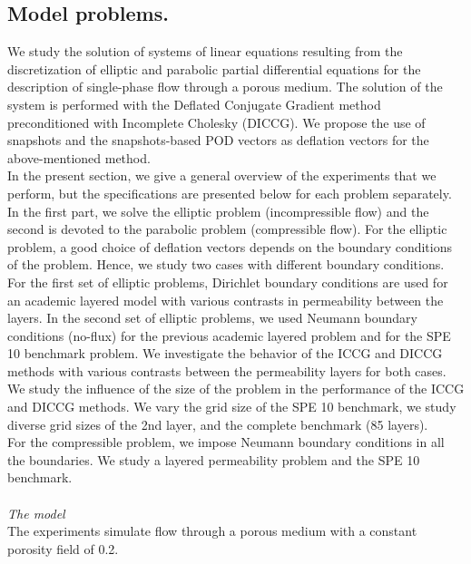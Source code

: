 \documentclass[12pt]{article}
\begin{document}
\subsection{Model problems.}\label{modpro}
\hspace{0.5cm} We study the solution of systems of linear equations resulting from the discretization of elliptic and parabolic partial differential equations for the description of single-phase flow through a porous medium. 
The solution of the system is performed with the Deflated Conjugate Gradient method preconditioned with Incomplete Cholesky (DICCG).
We propose the use of snapshots and the snapshots-based POD vectors as deflation vectors for the above-mentioned method.\\
In the present section, we give a general overview of the experiments that we perform, but the specifications
 are presented below for each problem separately. In the first part, we solve the elliptic problem (incompressible flow) and the second is devoted to the parabolic problem (compressible flow).
 For the elliptic problem, a good choice of deflation vectors depends on the boundary 
conditions of the problem. Hence, we study two cases with different boundary conditions. 
For the first set of elliptic problems, Dirichlet boundary conditions are used for 
an academic layered model with various contrasts in permeability between the layers. 
In the second set of elliptic problems, we used Neumann boundary conditions (no-flux) for the previous academic
layered problem and for the SPE 10 benchmark problem. 
We investigate the behavior of the ICCG and DICCG methods with various contrasts between the 
permeability layers for both cases. \\
We study the influence of the size of the problem in the performance of the ICCG and DICCG methods. We vary the grid size of the SPE 10 benchmark, we study diverse grid sizes of the 2nd layer, and the complete benchmark (85 layers). \\
For the compressible problem, we impose Neumann boundary conditions in all the boundaries. We study a layered permeability problem and the SPE 10 benchmark.
\\ \\
\emph{The model}\\
The experiments simulate flow through a porous medium with a constant porosity field of 0.2.
\end{document}
